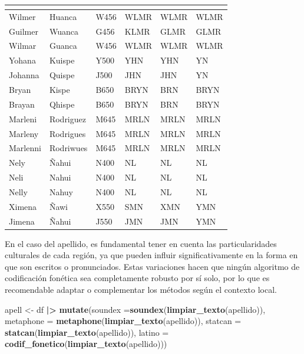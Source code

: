 \documentclass[
  12pt,
]{book}
\newenvironment{Shaded}{\begin{snugshade}}{\end{snugshade}}
\newcommand{\AttributeTok}[1]{\textcolor[rgb]{0.13,0.29,0.53}{#1}}
\newcommand{\FunctionTok}[1]{\textcolor[rgb]{0.13,0.29,0.53}{\textbf{#1}}}
\newcommand{\NormalTok}[1]{#1}
\newcommand{\OtherTok}[1]{\textcolor[rgb]{0.56,0.35,0.01}{#1}}
\newcommand{\SpecialCharTok}[1]{\textcolor[rgb]{0.81,0.36,0.00}{\textbf{#1}}}
\begin{document}
\begin{table}[t]
\fontsize{12.0pt}{14.4pt}\selectfont
\begin{tabular*}{\linewidth}{@{\extracolsep{\fill}}llllll}
\toprule
{\bfseries \cellcolor[HTML]{F9F9F9}{nombre}} & {\bfseries \cellcolor[HTML]{F9F9F9}{apellido}} & {\bfseries \cellcolor[HTML]{F9F9F9}{soundex}} & {\bfseries \cellcolor[HTML]{F9F9F9}{metaphone}} & {\bfseries \cellcolor[HTML]{F9F9F9}{statcan}} & {\bfseries \cellcolor[HTML]{F9F9F9}{latino}} \\ 
\midrule\addlinespace[2.5pt]
Wilmer & Huanca & W456 & WLMR & WLMR & WLMR \\ 
Guilmer & Wuanca & G456 & KLMR & GLMR & GLMR \\ 
Wilmar & Guanca & W456 & WLMR & WLMR & WLMR \\ 
Yohana & Kuispe & Y500 & YHN & YHN & YN \\ 
Johanna & Quispe & J500 & JHN & JHN & YN \\ 
Bryan & Kispe & B650 & BRYN & BRN & BRYN \\ 
Brayan & Qhispe & B650 & BRYN & BRN & BRYN \\ 
Marleni & Rodriguez & M645 & MRLN & MRLN & MRLN \\ 
Marleny & Rodrigues & M645 & MRLN & MRLN & MRLN \\ 
Marlenni & Rodriwues & M645 & MRLN & MRLN & MRLN \\ 
Nely & Ñahui & N400 & NL & NL & NL \\ 
Neli & Nahui & N400 & NL & NL & NL \\ 
Nelly & Nahuy & N400 & NL & NL & NL \\ 
Ximena & Ñawi & X550 & SMN & XMN & YMN \\ 
Jimena & Ñahui & J550 & JMN & JMN & YMN \\ 
\bottomrule
\end{tabular*}
\end{table}

En el caso del apellido, es fundamental tener en cuenta las particularidades culturales de cada región, ya que pueden influir significativamente en la forma en que son escritos o pronunciados. Estas variaciones hacen que ningún algoritmo de codificación fonética sea completamente robusto por sí solo, por lo que es recomendable adaptar o complementar los métodos según el contexto local.

\begin{Shaded}
\begin{Highlighting}[]
\NormalTok{apell }\OtherTok{\textless{}{-}}\NormalTok{ df }\SpecialCharTok{|\textgreater{}} 
         \FunctionTok{mutate}\NormalTok{(}\AttributeTok{soundex =}\FunctionTok{soundex}\NormalTok{(}\FunctionTok{limpiar\_texto}\NormalTok{(apellido)),}
                \AttributeTok{metaphone =} \FunctionTok{metaphone}\NormalTok{(}\FunctionTok{limpiar\_texto}\NormalTok{(apellido)),}
                \AttributeTok{statcan =} \FunctionTok{statcan}\NormalTok{(}\FunctionTok{limpiar\_texto}\NormalTok{(apellido)),}
                \AttributeTok{latino =} \FunctionTok{codif\_fonetico}\NormalTok{(}\FunctionTok{limpiar\_texto}\NormalTok{(apellido)))}
\end{Highlighting}
\end{Shaded}
\end{document}
